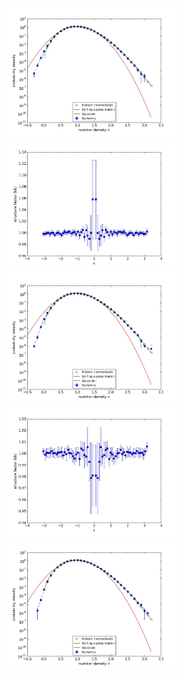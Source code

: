 \documentclass{article}
\begin{document}
\begin{figure}
\begin{center}
\end{center}
\includegraphics[width=0.5\linewidth,height=1.9in]{fig1/diff_dt0.25_hist_mid1.jpg}
\includegraphics[width=0.5\linewidth,height=1.9in]{fig1/diff_dt0.25_Sk_mid1.jpg}
\includegraphics[width=0.5\linewidth,height=1.9in]{fig1/diff_dt0.25_hist_mid2.jpg}
\includegraphics[width=0.5\linewidth,height=1.9in]{fig1/diff_dt0.25_Sk_mid2.jpg}
\includegraphics[width=0.5\linewidth,height=1.9in]{fig1/diff_dt0.25_hist_mid3.jpg}

\end{figure}
\end{document}
